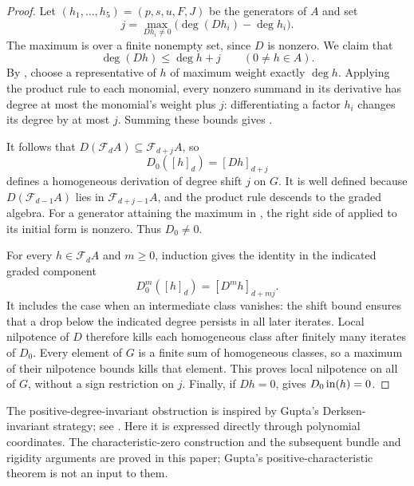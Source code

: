 \begin{proof}
Let $(h_1,\ldots,h_5)=(p,s,u,F,J)$ be the generators of $A$ and set
\begin{equation}\label{deg:shift}
 j=\max_{Dh_i\ne0}\bigl(\deg(Dh_i)-\deg h_i\bigr).
\end{equation}
The maximum is over a finite nonempty set, since $D$ is nonzero.
We claim that
\begin{equation}\label{deg:shift-bound}
 \deg(Dh)\leq\deg h+j\qquad(0\ne h\in A).
\end{equation}
By , choose a representative of $h$ of maximum
weight exactly $\deg h$.  Applying the product rule to each monomial,
every nonzero summand in its derivative has degree at most the
monomial's weight plus $j$: differentiating a factor $h_i$
changes its degree by at most $j$.  Summing these bounds gives
.

It follows that $D(\mathcal F_dA)\subseteq\mathcal F_{d+j}A$, so
\begin{equation}\label{deg:induced-map}
 D_0([h]_d)=[Dh]_{d+j}
\end{equation}
defines a homogeneous derivation of degree shift $j$ on $G$.
It is well defined because $D(\mathcal F_{d-1}A)$ lies in
$\mathcal F_{d+j-1}A$, and the product rule descends to the graded
algebra.  For a generator attaining the maximum in
, the right side of  applied
to its initial form is nonzero.  Thus $D_0\ne0$.

For every $h\in\mathcal F_dA$ and $m\geq 0$, induction gives the
identity in the indicated graded component
\begin{equation}\label{deg:iterate}
 D_0^m([h]_d)=[D^mh]_{d+mj}.
\end{equation}
It includes the case when an intermediate class vanishes: the shift
bound ensures that a drop below the indicated degree persists in
all later iterates.  Local nilpotence of $D$ therefore kills each
homogeneous class after finitely many iterates of $D_0$.
Every element of $G$ is a finite sum of homogeneous classes, so a
maximum of their nilpotence bounds kills that element.  This proves
local nilpotence on all of $G$, without a sign restriction on $j$.
Finally, if $Dh=0$,  gives
$D_0\operatorname{in}(h)=0$.
\end{proof}

The positive-degree-invariant obstruction is inspired by Gupta's
Derksen-invariant strategy; see \cite[Lemma~2.4 and the proof of
Proposition~3.6]{GuptaThreefold}. Here it is expressed directly through
polynomial coordinates. The characteristic-zero construction and the
subsequent bundle and rigidity arguments are proved in this paper;
Gupta's positive-characteristic theorem is not an input to them.

